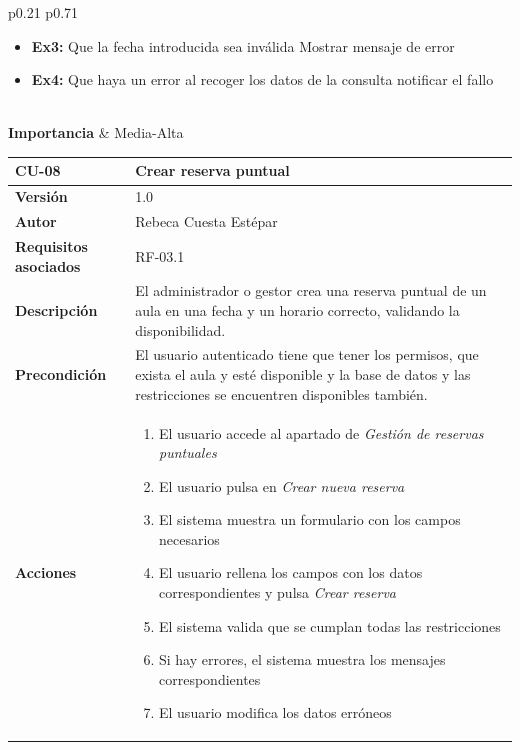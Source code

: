 \begin{table}[p]
\begin{tabularx}{\linewidth}{ p{0.21\columnwidth} p{0.71\columnwidth} }
\begin{itemize}[itemsep=0.15em, parsep=0pt, topsep=0pt, leftmargin=*]
			\item \textbf{Ex3:} Que la fecha introducida sea inválida \textrightarrow Mostrar mensaje de error
			\item \textbf{Ex4:} Que haya un error al recoger los datos de la consulta \textrightarrow notificar el fallo
		\end{itemize}\\ 
		\textbf{Importancia}          & Media-Alta \\
		\bottomrule
	\end{tabularx}
	\caption{CU-07 Consultar ocupación de aula}
\end{table}

\begin{table}[p]
	\centering
	\begin{tabularx}{\linewidth}{ p{} p{} }
		\toprule
		\textbf{CU-08}    & \textbf{Crear reserva puntual}\\
		\toprule
		\textbf{Versión}              & 1.0    \\
		\textbf{Autor}                & Rebeca Cuesta Estépar \\
		\textbf{Requisitos asociados} & RF-03.1 \\
		\textbf{Descripción}          & El administrador o gestor crea una reserva puntual de un aula en una fecha y un horario correcto, validando la disponibilidad. \\
		\textbf{Precondición}         &  El usuario autenticado tiene que tener los permisos, que exista el aula y esté disponible y la base de datos y las restricciones se encuentren disponibles también.\\
		\textbf{Acciones}             &
		\begin{enumerate}
			\def\labelenumi{\arabic{enumi}.}
			\tightlist
			\item El usuario accede al apartado de \emph{Gestión de reservas puntuales}
			\item El usuario pulsa en \emph{Crear nueva reserva}
			\item El sistema muestra un formulario con los campos necesarios
			\item El usuario rellena los campos con los datos correspondientes y pulsa \emph{Crear reserva}
			\item El sistema valida que se cumplan todas las restricciones
			\item Si hay errores, el sistema muestra los mensajes correspondientes
			\item El usuario modifica los datos erróneos

\end{enumerate}
\end{tabularx}
\end{table}

